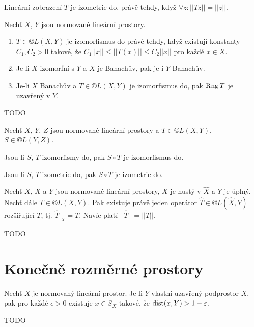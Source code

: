 \documentclass[12pt]{article}					%
\begin{document}
\begin{poznamka}
	Lineární zobrazení $T$ je izometrie do, právě tehdy, když $\forall z: ||Tz|| = ||z||$.
\end{poznamka}

\begin{tvrzeni}
	Nechť $X$, $Y$ jsou normované lineární prostory.

	\begin{enumerate}
		\item $T \in ©L(X, Y)$ je izomorfismus do právě tehdy, když existují konstanty $C_1, C_2 > 0$ takové, že $C_1 ||x|| ≤ ||T(x)|| ≤ C_2 ||x||$ pro každé $x \in X$.
		\item Je-li $X$ izomorfní s $Y$ a $X$ je Banachův, pak je i $Y$ Banachův.
		\item Je-li $X$ Banachův a $T \in ©L(X, Y)$ je izomorfismus do, pak $\operatorname{Rng} T$ je uzavřený v $Y$.
	\end{enumerate}

	\begin{dukazin}
		TODO
	\end{dukazin}
\end{tvrzeni}

\begin{poznamka}[Fakt]
	Nechť $X$, $Y$, $Z$ jsou normované lineární prostory a $T \in ©L(X, Y)$, $S \in ©L(Y, Z)$.

	Jsou-li $S$, $T$ izomorfismy do, pak $S \circ T$ je izomorfismus do.
	
	Jsou-li $S$, $T$ izometrie do, pak $S \circ T$ je izometrie do.
\end{poznamka}

\begin{veta}
	Nechť $X$, $\hat{X}$ a $Y$ jsou normované lineární prostory, $X$ je hustý v $\hat{X}$ a $Y$ je úplný. Nechť dále $T \in ©L(X, Y)$. Pak existuje právě jeden operátor $\hat{T} \in ©L(\hat{X}, Y)$ rozšiřující $T$, tj. $\hat{T}|_X = T$. Navíc platí $||\hat{T}|| = ||T||$.

	\begin{dukazin}
		TODO
	\end{dukazin}
\end{veta}


\section{Konečně rozměrné prostory}
\begin{lemma}
	Nechť $X$ je normovaný lineární prostor. Je-li $Y$ vlastní uzavřený podprostor $X$, pak pro každé $\epsilon > 0$ existuje $x \in S_X$ takové, že $\operatorname{dist}(x, Y) > 1 - \varepsilon$.

	\begin{dukazin}
		TODO
	\end{dukazin}
\end{lemma}
\end{document}
